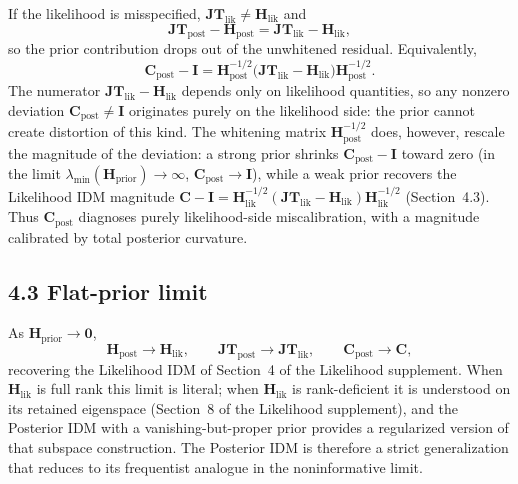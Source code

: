 \documentclass[11pt]{article}
\begin{document}
If the likelihood is misspecified, $\mathbf{JT}_{\mathrm{lik}} \neq \mathbf H_{\mathrm{lik}}$ and
\begin{equation}
\mathbf{JT}_{\mathrm{post}} - \mathbf H_{\mathrm{post}}
=
\mathbf{JT}_{\mathrm{lik}} - \mathbf H_{\mathrm{lik}},
\label{eq:posterior-residual}
\end{equation}
so the prior contribution drops out of the unwhitened residual. Equivalently,
\begin{equation}
\mathbf C_{\mathrm{post}} - \mathbf I
=
\mathbf H_{\mathrm{post}}^{-1/2}
\bigl(\mathbf{JT}_{\mathrm{lik}} - \mathbf H_{\mathrm{lik}}\bigr)
\mathbf H_{\mathrm{post}}^{-1/2}.
\label{eq:posterior-c-residual}
\end{equation}
The numerator $\mathbf{JT}_{\mathrm{lik}} - \mathbf H_{\mathrm{lik}}$ depends only on likelihood quantities, so any nonzero deviation $\mathbf C_{\mathrm{post}} \neq \mathbf I$ originates purely on the likelihood side: the prior cannot create distortion of this kind. The whitening matrix $\mathbf H_{\mathrm{post}}^{-1/2}$ does, however, rescale the magnitude of the deviation: a strong prior shrinks $\mathbf C_{\mathrm{post}} - \mathbf I$ toward zero (in the limit $\lambda_{\min}(\mathbf H_{\mathrm{prior}}) \to \infty$, $\mathbf C_{\mathrm{post}} \to \mathbf I$), while a weak prior recovers the Likelihood IDM magnitude $\mathbf C - \mathbf I = \mathbf H_{\mathrm{lik}}^{-1/2}(\mathbf{JT}_{\mathrm{lik}} - \mathbf H_{\mathrm{lik}})\mathbf H_{\mathrm{lik}}^{-1/2}$ (Section~4.3). Thus $\mathbf C_{\mathrm{post}}$ diagnoses purely likelihood-side miscalibration, with a magnitude calibrated by total posterior curvature.

\subsection*{4.3 Flat-prior limit}

As $\mathbf H_{\mathrm{prior}} \to \mathbf 0$,
\begin{equation}
\mathbf H_{\mathrm{post}} \to \mathbf H_{\mathrm{lik}},
\qquad
\mathbf{JT}_{\mathrm{post}} \to \mathbf{JT}_{\mathrm{lik}},
\qquad
\mathbf C_{\mathrm{post}} \to \mathbf C,
\label{eq:posterior-flat-limit}
\end{equation}
recovering the Likelihood IDM of Section~4 of the Likelihood supplement. When $\mathbf H_{\mathrm{lik}}$ is full rank this limit is literal; when $\mathbf H_{\mathrm{lik}}$ is rank-deficient it is understood on its retained eigenspace (Section~8 of the Likelihood supplement), and the Posterior IDM with a vanishing-but-proper prior provides a regularized version of that subspace construction. The Posterior IDM is therefore a strict generalization that reduces to its frequentist analogue in the noninformative limit.
\end{document}
